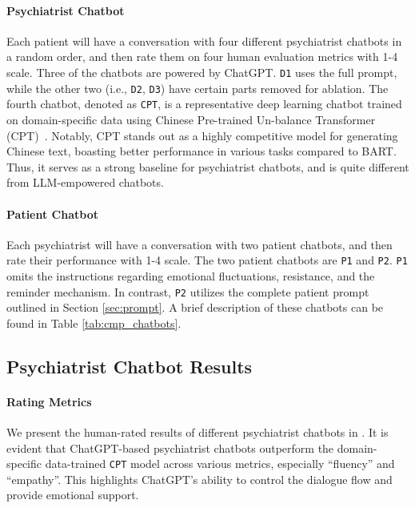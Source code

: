 \paragraph{Psychiatrist Chatbot} 
Each patient will have a conversation with four different psychiatrist chatbots in a random order, and then rate them on four human evaluation metrics with 1-4 scale. 
Three of the chatbots are powered by ChatGPT. \texttt{D1} uses the full prompt, 
while the other two (i.e., \texttt{D2}, 
\texttt{D3}) have certain parts removed for ablation. 
The fourth chatbot, denoted as \texttt{CPT}, is a representative deep learning chatbot trained on domain-specific data \cite{yao-etal-2022-d4} using Chinese Pre-trained Un-balance Transformer (CPT)~\cite{shao2021cpt}. Notably, CPT stands out as a highly competitive model for generating Chinese text, boasting better performance in various tasks compared to BART. Thus, it serves as a strong baseline for psychiatrist chatbots, and is quite different from LLM-empowered chatbots.
\paragraph{Patient Chatbot}
Each psychiatrist will have a conversation with two patient chatbots, and then rate their performance with 1-4 scale. 
The two patient chatbots are \texttt{P1} and \texttt{P2}. \texttt{P1} omits the instructions regarding emotional fluctuations, resistance, and the reminder mechanism. In contrast, \texttt{P2} utilizes the complete patient prompt outlined in Section \ref{sec:prompt}.
A brief description of these chatbots can be found in Table \ref{tab:cmp_chatbots}.

\subsection{Psychiatrist Chatbot Results}
\paragraph{Rating Metrics}
We present the human-rated results of different psychiatrist chatbots in . It is evident that ChatGPT-based psychiatrist chatbots outperform the domain-specific data-trained \texttt{CPT} model across various metrics, especially ``fluency'' and ``empathy''. This highlights ChatGPT's ability to control the dialogue flow and provide emotional support. 

